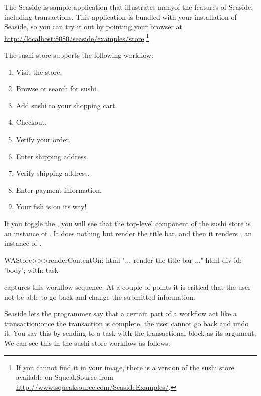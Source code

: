 \documentclass[a4paper,10pt,twoside]{book}
\begin{document}
The Seaside  is sample application that illustrates manyof the features of Seaside, including transactions.
This application is bundled with your installation of Seaside, so you can try it out by
pointing your browser at
\url{http://localhost:8080/seaside/examples/store}.\footnote{If you cannot find it in
your image, there is a version of the sushi store available on SqueakSource from
\url{http://www.squeaksource.com/SeasideExamples/}.}

The sushi store supports the following workflow:
\begin{enumerate}[itemsep=0pt]
  \item Visit the store.
  \item Browse or search for sushi.
  \item Add sushi to your shopping cart.
  \item Checkout.
  \item Verify your order.
  \item Enter shipping address.
  \item Verify shipping address.
  \item Enter payment information.
  \item Your fish is on its way!
\end{enumerate}

If you toggle the , you will see that the top-level component of
the sushi store is an instance of .
It does nothing but render the title bar, and then it renders , an instance of
.

\begin{code}{}
WAStore>>>renderContentOn: html
	"... render the title bar ..."
	html div id: 'body'; with: task
\end{code}

 captures this workflow sequence. At a couple of points it is
critical that the user not be able to go back and change the submitted information.


Seaside lets the programmer say that a certain part of a workflow act like a transaction:once the transaction is complete, the user cannot go back and undo it.
You say this by sending  to a task with the transactional
block as its argument.
We can see this in the sushi store workflow as follows:
\end{document}
